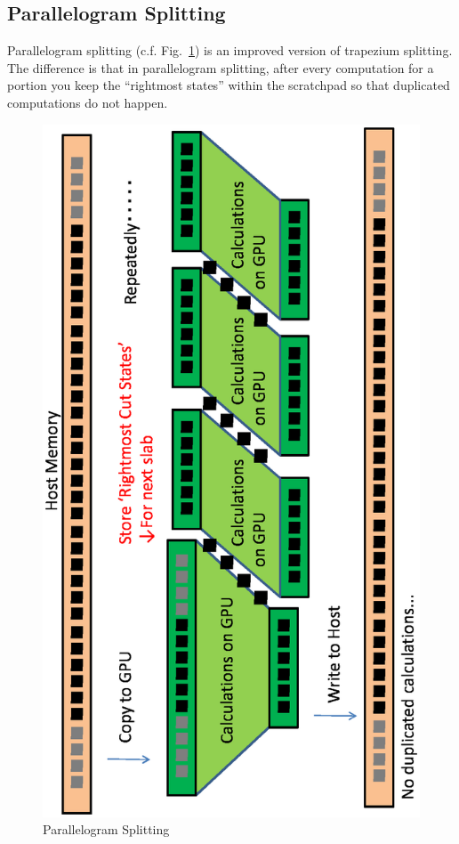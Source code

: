 \documentclass[twocolumn]{article}
\begin{document}
\subsection{Parallelogram Splitting}

Parallelogram splitting (c.f. Fig.~\ref{FigureParallelogram}) is an improved
version of trapezium splitting. The difference is that in parallelogram
splitting, after every computation for a portion you keep the ``rightmost
states'' within the scratchpad so that duplicated computations do not happen.

\begin{figure}
  \includegraphics[scale=0.5,angle=270]{figure/parallelogram.eps}
  \caption{Parallelogram Splitting}\label{FigureParallelogram}
\end{figure}
\end{document}
